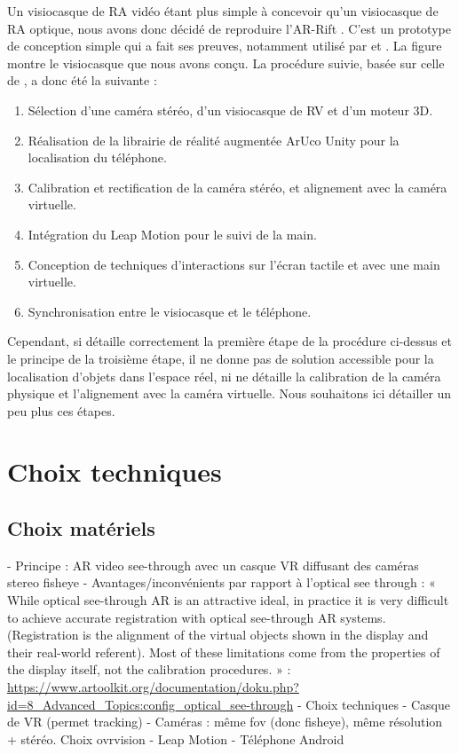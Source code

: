 Un visiocasque de RA vidéo étant plus simple à concevoir qu'un visiocasque de RA optique, nous avons donc décidé de reproduire l'AR-Rift \citep{Steptoe2013}. C'est un prototype de conception simple qui a fait ses preuves, notamment utilisé par \cite{Steptoe2014} et \cite{Piumsomboon2014}. La figure  montre le visiocasque que nous avons conçu. La procédure suivie, basée sur celle de \cite{Steptoe2013}, a donc été la suivante :
\begin{enumerate}
  \item Sélection d'une caméra stéréo, d'un visiocasque de RV et d'un moteur 3D.
  \item Réalisation de la librairie de réalité augmentée ArUco Unity pour la localisation du téléphone.
  \item Calibration et rectification de la caméra stéréo, et alignement avec la caméra virtuelle.
  \item Intégration du Leap Motion pour le suivi de la main.
  \item Conception de techniques d'interactions sur l'écran tactile et avec une main virtuelle.
  \item Synchronisation entre le visiocasque et le téléphone.
\end{enumerate}

Cependant, si \cite{Steptoe2013} détaille correctement la première étape de la procédure ci-dessus et le principe de la troisième étape, il ne donne pas de solution accessible pour la localisation d'objets dans l'espace réel, ni ne détaille la calibration de la caméra physique et l'alignement avec la caméra virtuelle. Nous souhaitons ici détailler un peu plus ces étapes.



\section{Choix techniques}
\subsection{Choix matériels}
- Principe : AR video see-through avec un casque VR diffusant des caméras stereo fisheye
  - Avantages/inconvénients par rapport à l'optical see through : « While optical see-through AR is an attractive ideal, in practice it is very difficult to achieve accurate registration with optical see-through AR systems. (Registration is the alignment of the virtual objects shown in the display and their real-world referent). Most of these limitations come from the properties of the display itself, not the calibration procedures. » : \url{https://www.artoolkit.org/documentation/doku.php?id=8_Advanced_Topics:config_optical_see-through}
- Choix techniques
  - Casque de VR (permet tracking)
  - Caméras : même fov (donc fisheye), même résolution + stéréo. Choix ovrvision
  - Leap Motion
  - Téléphone Android

